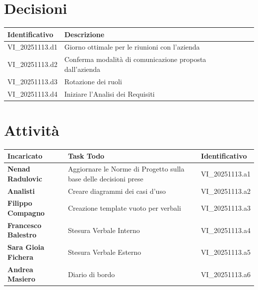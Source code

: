 \documentclass[a4paper,12pt]{article}
\begin{document}
    \section{Decisioni} {
        \begin{tabularx}{\textwidth}{|l|X|l|}
            \hline
            \textbf{Identificativo} & \textbf{Descrizione}\\
            \hline
            VI\_20251113.d1 & Giorno ottimale per le riunioni con l'azienda\\
            \hline
            VI\_20251113.d2 & Conferma modalità di comunicazione proposta dall'azienda\\
            \hline
            VI\_20251113.d3 & Rotazione dei ruoli\\
            \hline
            VI\_20251113.d4 & Iniziare l'Analisi dei Requisiti\\
            \hline
        \end{tabularx}
    }

    \section{Attività} {
        \begin{tabularx}{\textwidth}{|l|X|l|}
            \hline
            \textbf{Incaricato} & \textbf{Task Todo} & \textbf{Identificativo} \\
            \hline
            \textbf{Nenad Radulovic} & Aggiornare le Norme di Progetto sulla base delle decisioni prese & VI\_20251113.a1\\
            \hline
            \textbf{Analisti} & Creare diagrammi dei casi d'uso & VI\_20251113.a2\\
            \hline
            \textbf{Filippo Compagno} & Creazione template vuoto per verbali & VI\_20251113.a3\\
            \hline
            \textbf{Francesco Balestro} & Stesura Verbale Interno & VI\_20251113.a4\\
            \hline
            \textbf{Sara Gioia Fichera} & Stesura Verbale Esterno & VI\_20251113.a5\\
            \hline
            \textbf{Andrea Masiero} & Diario di bordo & VI\_20251113.a6\\
            \hline
        \end{tabularx}
    }
\end{document}
